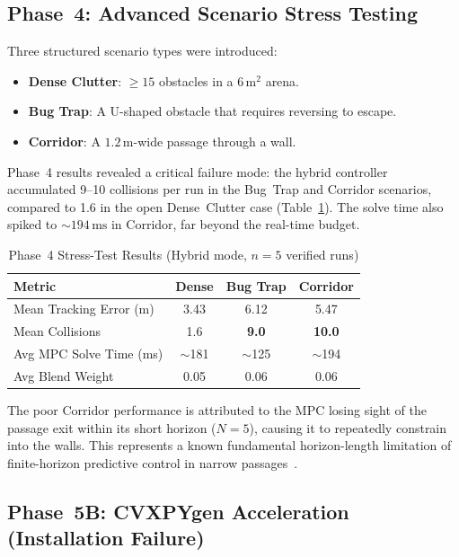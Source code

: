 \documentclass[journal]{IEEEtran}
\begin{document}
\subsection{Phase~4: Advanced Scenario Stress Testing}

Three structured scenario types were introduced:

\begin{itemize}
  \item \textbf{Dense Clutter}: $\geq\!15$ obstacles in a $6\,\text{m}^2$ arena.
  \item \textbf{Bug Trap}: A U-shaped obstacle that requires reversing to escape.
  \item \textbf{Corridor}: A $1.2\,\text{m}$-wide passage through a wall.
\end{itemize}

Phase~4 results revealed a critical failure mode: the hybrid controller
accumulated 9--10 collisions per run in the Bug~Trap and Corridor scenarios,
compared to 1.6 in the open Dense~Clutter case (Table~\ref{tab:phase4}).
The solve time also spiked to $\sim\!194\,\text{ms}$ in Corridor, far beyond
the real-time budget.

\begin{table}[!t]
  \caption{Phase~4 Stress-Test Results (Hybrid mode, $n=5$ verified runs)}
  \label{tab:phase4}
  \centering
  \begin{tabular}{lccc}
    \toprule
    Metric                   & Dense   & Bug Trap & Corridor \\
    \midrule
    Mean Tracking Error (m)  & 3.43    & 6.12     & 5.47 \\
    Mean Collisions          & 1.6     & \textbf{9.0}  & \textbf{10.0} \\
    Avg MPC Solve Time (ms)  & $\sim$181 & $\sim$125 & $\sim$194 \\
    Avg Blend Weight         & 0.05    & 0.06     & 0.06 \\
    \bottomrule
  \end{tabular}
\end{table}

The poor Corridor performance is attributed to the MPC losing sight of the
passage exit within its short horizon ($N=5$), causing it to repeatedly
constrain into the walls.
This represents a known fundamental horizon-length limitation of finite-horizon
predictive control in narrow passages~\cite{rawlings2017}.

\subsection{Phase~5B: CVXPYgen Acceleration (Installation Failure)}
\end{document}
